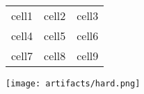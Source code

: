 \documentclass{article}
\begin{document}
\begin{center}
\begin{tabular}{|c|c|c|} 
\hline
cell1 & cell2 & cell3 \\
cell4 & cell5 & cell6 \\
cell7 & cell8 & cell9 \\
\hline
\end{tabular}
\end{center}
\begin{center}
\texttt{[image: artifacts/hard.png]}
\end{center}
\end{document}
